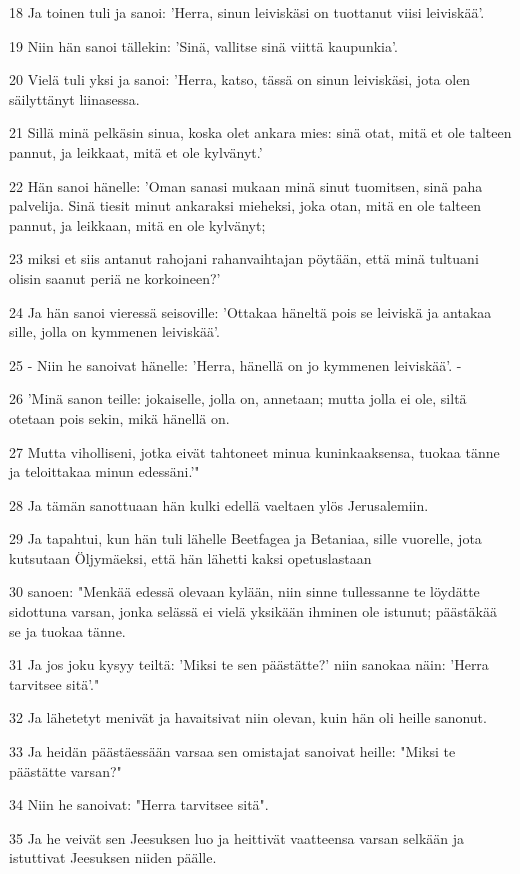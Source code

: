 \par 18 Ja toinen tuli ja sanoi: 'Herra, sinun leiviskäsi on tuottanut viisi leiviskää'.
\par 19 Niin hän sanoi tällekin: 'Sinä, vallitse sinä viittä kaupunkia'.
\par 20 Vielä tuli yksi ja sanoi: 'Herra, katso, tässä on sinun leiviskäsi, jota olen säilyttänyt liinasessa.
\par 21 Sillä minä pelkäsin sinua, koska olet ankara mies: sinä otat, mitä et ole talteen pannut, ja leikkaat, mitä et ole kylvänyt.'
\par 22 Hän sanoi hänelle: 'Oman sanasi mukaan minä sinut tuomitsen, sinä paha palvelija. Sinä tiesit minut ankaraksi mieheksi, joka otan, mitä en ole talteen pannut, ja leikkaan, mitä en ole kylvänyt;
\par 23 miksi et siis antanut rahojani rahanvaihtajan pöytään, että minä tultuani olisin saanut periä ne korkoineen?'
\par 24 Ja hän sanoi vieressä seisoville: 'Ottakaa häneltä pois se leiviskä ja antakaa sille, jolla on kymmenen leiviskää'.
\par 25 - Niin he sanoivat hänelle: 'Herra, hänellä on jo kymmenen leiviskää'. -
\par 26 'Minä sanon teille: jokaiselle, jolla on, annetaan; mutta jolla ei ole, siltä otetaan pois sekin, mikä hänellä on.
\par 27 Mutta viholliseni, jotka eivät tahtoneet minua kuninkaaksensa, tuokaa tänne ja teloittakaa minun edessäni.'"
\par 28 Ja tämän sanottuaan hän kulki edellä vaeltaen ylös Jerusalemiin.
\par 29 Ja tapahtui, kun hän tuli lähelle Beetfagea ja Betaniaa, sille vuorelle, jota kutsutaan Öljymäeksi, että hän lähetti kaksi opetuslastaan
\par 30 sanoen: "Menkää edessä olevaan kylään, niin sinne tullessanne te löydätte sidottuna varsan, jonka selässä ei vielä yksikään ihminen ole istunut; päästäkää se ja tuokaa tänne.
\par 31 Ja jos joku kysyy teiltä: 'Miksi te sen päästätte?' niin sanokaa näin: 'Herra tarvitsee sitä'."
\par 32 Ja lähetetyt menivät ja havaitsivat niin olevan, kuin hän oli heille sanonut.
\par 33 Ja heidän päästäessään varsaa sen omistajat sanoivat heille: "Miksi te päästätte varsan?"
\par 34 Niin he sanoivat: "Herra tarvitsee sitä".
\par 35 Ja he veivät sen Jeesuksen luo ja heittivät vaatteensa varsan selkään ja istuttivat Jeesuksen niiden päälle.
